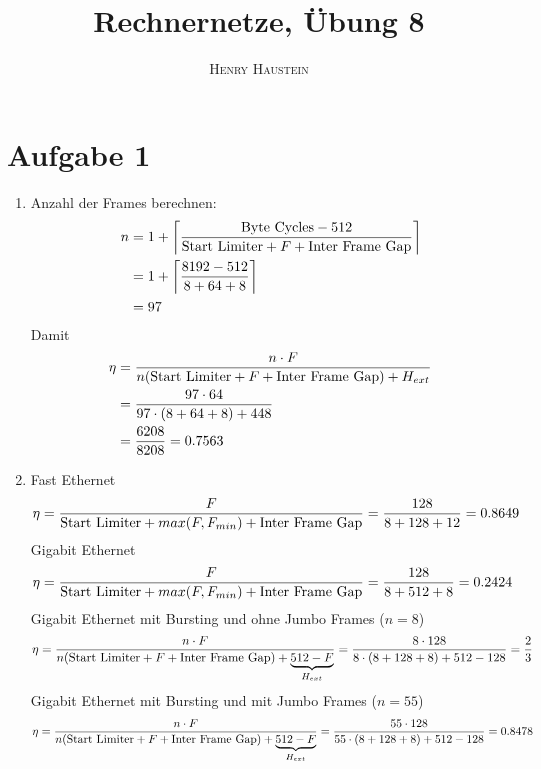 \documentclass{article}
\title{\textbf{Rechnernetze, Übung 8}}
\author{\textsc{Henry Haustein}}
\date{}
\begin{document}
	\maketitle
	
	\section*{Aufgabe 1}
	\begin{enumerate}[label=(\alph*)]
		\item Anzahl der Frames berechnen:
		\begin{align}
			n &= 1+\left\lceil \frac{\text{Byte Cycles} - 512}{\text{Start Limiter} + F + \text{Inter Frame Gap}}\right\rceil \notag \\
			&= 1+\left\lceil \frac{8192 - 512}{8 + 64 + 8}\right\rceil \notag \\
			&= 97 \notag
		\end{align}
		Damit
		\begin{align}
			\eta &= \frac{n\cdot F}{n(\text{Start Limiter} + F + \text{Inter Frame Gap}) + H_{ext}} \notag \\
			&= \frac{97\cdot 64}{97\cdot (8+64+8) + 448} \notag \\
			&= \frac{6208}{8208} = 0.7563 \notag
		\end{align}
		\item Fast Ethernet
		\begin{align}
			\eta = \frac{F}{\text{Start Limiter} + max(F,F_{min}) + \text{Inter Frame Gap}} = \frac{128}{8+128+12} = 0.8649 \notag
		\end{align}
		Gigabit Ethernet
		\begin{align}
			\eta = \frac{F}{\text{Start Limiter} + max(F,F_{min}) + \text{Inter Frame Gap}} = \frac{128}{8+512+8} = 0.2424 \notag
		\end{align}
		Gigabit Ethernet mit Bursting und ohne Jumbo Frames ($n=8$)
		\begin{align}
			\eta = \frac{n\cdot F}{n(\text{Start Limiter} + F + \text{Inter Frame Gap}) + \underbrace{512-F}_{H_{ext}}} = \frac{8\cdot 128}{8\cdot (8+128+8) + 512 - 128} = \frac{2}{3} \notag
		\end{align}
		Gigabit Ethernet mit Bursting und mit Jumbo Frames ($n=55$)
		\begin{align}
			\eta = \frac{n\cdot F}{n(\text{Start Limiter} + F + \text{Inter Frame Gap}) + \underbrace{512-F}_{H_{ext}}} = \frac{55\cdot 128}{55\cdot (8+128+8) + 512 - 128} = 0.8478 \notag
		\end{align}
	\end{enumerate}
\end{document}
